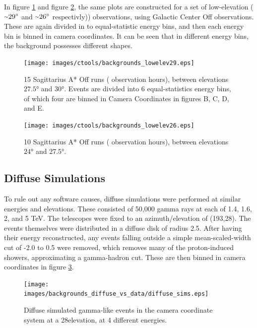 In figure \ref{fig:back_lowelev29} and figure \ref{fig:back_lowelev26}, the same plots are constructed for a set of low-elevation ($ \nicetilde \ang{29} $ and $ \nicetilde \ang{26} $ respectivly)) observations, using Galactic Center Off observations.
These are again divided in to equal-statistic energy bins, and then each energy bin is binned in camera coordinates.
It can be seen that in different energy bins, the background possesses different shapes.

\begin{figure}[ht]
  \begin{center}
    \texttt{[image: images/ctools/backgrounds\_lowelev29.eps]}
    \caption[CTOOLS Background at 29\degree Elevation]{15 Sagittarius A* Off runs ( observation hours), between elevations $ \ang{27.5} $ and $ \ang{30} $.  Events are divided into 6 equal-statistics energy bins, of which four are binned in Camera Coordinates in figures B, C, D, and E.}\label{fig:back_lowelev29}
  \end{center}
\end{figure}

\begin{figure}[ht]
  \begin{center}
    \texttt{[image: images/ctools/backgrounds\_lowelev26.eps]}
    \caption[CTOOLS Background at 26\degree Elevation]{10 Sagittarius A* Off runs ( observation hours), between elevations $ \ang{24} $ and $ \ang{27.5} $. }\label{fig:back_lowelev26}
  \end{center}
\end{figure}


\subsection{Diffuse Simulations}

To rule out any software causes, diffuse simulations were performed at similar energies and elevations.
These consisted of 50,000 gamma rays at each of 1.4, 1.6, 2, and 5 TeV.
The telescopes were fixed to an azimuth/elevation of (193\degree,28\degree).
The events themselves were distributed in a diffuse disk of radius 2.5\degree.
After having their energy reconstructed, any events falling outside a simple mean-scaled-width cut of -2.0 to 0.5 were removed, which removes many of the proton-induced showers, approximating a gamma-hadron cut.
These are then binned in camera coordinates in figure \ref{fig:back_simdiffuse}.

\begin{figure}[ht]
  \begin{center}
    \texttt{[image: images/backgrounds\_diffuse\_vs\_data/diffuse\_sims.eps]}
    \caption[Diffuse Simulated Backgrounds]{Diffuse simulated gamma-like events in the camera coordinate system at a 28\degree elevation, at 4 different energies.}\label{fig:back_simdiffuse}
  \end{center}
\end{figure}

